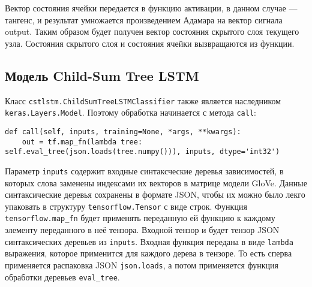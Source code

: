 Вектор состояния ячейки передается в функцию активации, в данном случае --- тангенс, и результат умножается произведением Адамара на вектор сигнала output. Таким образом будет получен вектор состояния скрытого слоя текущего узла. Состояния скрытого слоя и состояния ячейки вызвращаются из функции.

\subsection{Модель Child-Sum Tree LSTM}
Класс \texttt{cstlstm.ChildSumTreeLSTMClassifier} также является наследником \texttt{keras.Layers.Model}. Поэтому обработка начинается с метода \texttt{call}:
\medskip
\begin{lstlisting}[style=Python]
  def call(self, inputs, training=None, *args, **kwargs):
    out = tf.map_fn(lambda tree: self.eval_tree(json.loads(tree.numpy())), inputs, dtype='int32')
\end{lstlisting}
\medskip

Параметр \texttt{inputs} содержит входные синтаксческие деревья зависимостей, в которых слова заменены индексами их векторов в матрице модели GloVe. Данные синтаксические деревья сохранены в формате JSON, чтобы их можно было лекго упаковать в структуру \texttt{tensorflow.Tensor} с виде строк. Функция \texttt{tensorflow.map\_fn} будет применять переданную ей функцию к каждому элементу переданного в неё тензора. Входной тензор и будет тензор JSON синтаксических деревьев из \texttt{inputs}. Входная функция передана в виде \texttt{lambda} выражения, которое применится для каждого дерева в тензоре. То есть сперва применяется распаковка JSON \texttt{json.loads}, а потом применяется функция обработки деревьев \texttt{eval\_tree}.

